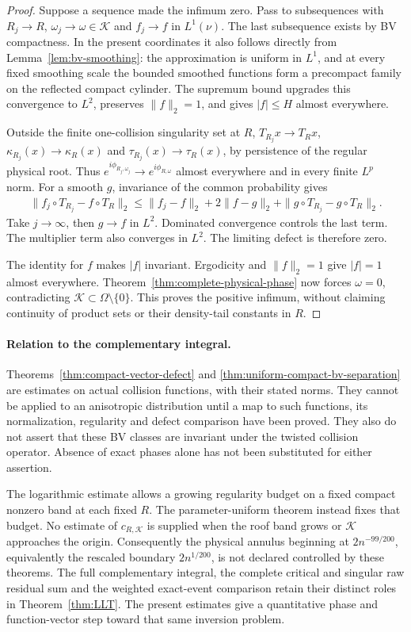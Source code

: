 \begin{proof}
Suppose a sequence made the infimum zero. Pass to subsequences with
$R_j\to R$, $\omega_j\to\omega\in\mathcal K$ and $f_j\to f$ in
$L^1(\nu)$. The last subsequence exists by BV compactness. In the present
coordinates it also follows directly from
Lemma~\ref{lem:bv-smoothing}: the approximation is uniform in $L^1$,
and at every fixed smoothing scale the bounded smoothed functions
form a precompact family on the reflected compact cylinder.
The supremum bound upgrades this convergence to $L^2$, preserves
$\|f\|_2=1$, and gives $|f|\le H$ almost everywhere.

Outside the finite one-collision singularity set at $R$,
$T_{R_j}x\to T_Rx$, $\kappa_{R_j}(x)\to\kappa_R(x)$ and
$\tau_{R_j}(x)\to\tau_R(x)$, by persistence of the regular physical
root. Thus $e^{i\phi_{R_j,\omega_j}}\to e^{i\phi_{R,\omega}}$
almost everywhere and in every finite $L^p$ norm. For a smooth $g$,
invariance of the common probability gives
\begin{align*}
 \|f_j\circ T_{R_j}-f\circ T_R\|_2
 \le\|f_j-f\|_2+2\|f-g\|_2
                      +\|g\circ T_{R_j}-g\circ T_R\|_2.
\end{align*}
Take $j\to\infty$, then $g\to f$ in $L^2$. Dominated convergence
controls the last term. The multiplier term also converges in $L^2$.
The limiting defect is therefore zero.

The identity for $f$ makes $|f|$ invariant. Ergodicity and $\|f\|_2=1$
give $|f|=1$ almost everywhere. Theorem~\ref{thm:complete-physical-phase}
now forces $\omega=0$, contradicting $\mathcal K\subset\Omega\setminus\{0\}$.
This proves the positive infimum, without claiming continuity of
product sets or their density-tail constants in $R$.
\end{proof}

\paragraph{Relation to the complementary integral.}
Theorems~\ref{thm:compact-vector-defect} and
\ref{thm:uniform-compact-bv-separation} are estimates on actual
collision functions, with their stated norms. They cannot be applied
to an anisotropic distribution until a map to such functions, its
normalization, regularity and defect comparison have been proved.
They also do not assert that these BV classes are invariant under
the twisted collision operator. Absence of exact phases alone has not
been substituted for either assertion.

The logarithmic estimate allows a growing regularity budget on a fixed
compact nonzero band at each fixed $R$. The parameter-uniform theorem
instead fixes that budget. No estimate of $c_{R,\mathcal K}$ is supplied
when the roof band grows or $\mathcal K$ approaches the origin.
Consequently the physical annulus beginning at
$2n^{-99/200}$, equivalently the rescaled boundary $2n^{1/200}$,
is not declared controlled by these theorems. The full complementary
integral, the complete critical and singular raw residual sum and the
weighted exact-event comparison retain their distinct roles in
Theorem~\ref{thm:LLT}. The present estimates give a quantitative
phase and function-vector step toward that same inversion problem.
